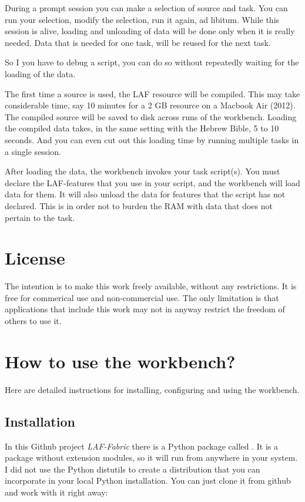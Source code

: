 \documentclass[letterpaper,10pt,english]{sphinxmanual}
\begin{document}
During a prompt session you can make a selection of source and task.
You can run your selection, modify the selection, run it again, ad libitum.
While this session is alive, loading and unloading of data will be done only when it is really needed.
Data that is needed for one task, will be reused for the next task.

So I you have to debug a script, you can do so without repeatedly waiting for the loading of the data.

The first time a source is used, the LAF resource will be compiled.
This may take considerable time, say 10 minutes for a 2 GB resource on a Macbook Air (2012).
The compiled source will be saved to disk across runs of the workbench.
Loading the compiled data takes, in the same setting with the Hebrew Bible, 5 to 10 seconds.
And you can even cut out this loading time by running multiple tasks in a single session.

After loading the data, the workbench invokes your task script(s).
You must declare the LAF-features that you use in your script, and the workbench will load data for them.
It will also unload the data for features that the script has not declared.
This is in order not to burden the RAM with data that does not pertain to the task.


\section{License}
\label{workbench:license}
The intention is to make this work freely available, without any restrictions.
It is free for commerical use and non-commercial use.
The only limitation is that applications that include this work may not in anyway restrict the freedom
of others to use it.


\section{How to use the workbench?}
\label{workbench:how-to-use-the-workbench}
Here are detailed instructions for installing, configuring and using the workbench.


\subsection{Installation}
\label{workbench:installation}
In this Github project \emph{LAF-Fabric} there is a Python package called {\hyperref[graf/graf:module-graf]{}}.
It is a package without extension modules, so it will run from anywhere in your system.
I did not use the Python distutils to create a distribution that you can incorporate in your local Python installation.
You can just clone it from github and work with it right away:
\end{document}
